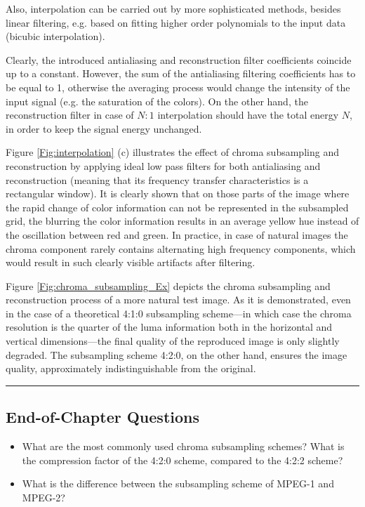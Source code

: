 Also, interpolation can be carried out by more sophisticated methods, besides linear filtering, e.g. based on fitting higher order polynomials to the input data (bicubic interpolation).

\vspace{3mm}
Clearly, the introduced antialiasing and reconstruction filter coefficients coincide up to a constant.
However, the sum of the antialiasing filtering coefficients has to be equal to 1, otherwise the averaging process would change the intensity of the input signal (e.g. the saturation of the colors).
On the other hand, the reconstruction filter in case of $N:1$ interpolation should have the total energy $N$, in order to keep the signal energy unchanged.

Figure \ref{Fig:interpolation} (c) illustrates the effect of chroma subsampling and reconstruction by applying ideal low pass filters for both antialiasing and reconstruction (meaning that its frequency transfer characteristics is a rectangular window).
It is clearly shown that on those parts of the image where the rapid change of color information can not be represented in the subsampled grid, the blurring the color information results in an average yellow hue instead of the oscillation between red and green.
In practice, in case of natural images the chroma component rarely contains alternating high frequency components, which would result in such clearly visible artifacts after filtering.

Figure \ref{Fig:chroma_subsampling_Ex} depicts the chroma subsampling and reconstruction process of a more natural test image.
As it is demonstrated, even in the case of a theoretical 4:1:0 subsampling scheme---in which case the chroma resolution is the quarter of the luma information both in the horizontal and vertical dimensions---the final quality of the reproduced image is only slightly degraded.
The subsampling scheme 4:2:0, on the other hand, ensures the image quality, approximately indistinguishable from the original.

\vspace{2cm}
\noindent\rule{12cm}{0.4pt}

\subsection*{End-of-Chapter Questions}

\begin{itemize}
\item What are the most commonly used chroma subsampling schemes? 
What is the compression factor of the 4:2:0 scheme, compared to the 4:2:2 scheme?
\item What is the difference between the subsampling scheme of MPEG-1 and MPEG-2?
\end{itemize}